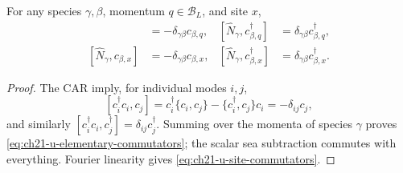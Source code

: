 \begin{lemma}
\label{lem:ch21-u-fundamental-commutators}
For any species \(\gamma,\beta\), momentum \(q\in\mathcal B_L\), and
site \(x\),
\begin{align}
 [\widehat N_\gamma,c_{\beta,q}]
   &=-\delta_{\gamma\beta}c_{\beta,q},&
 [\widehat N_\gamma,c_{\beta,q}^\dagger]
   &=\delta_{\gamma\beta}c_{\beta,q}^\dagger,
 \label{eq:ch21-u-elementary-commutators}\\
 [\widehat N_\gamma,c_{\beta,x}]
   &=-\delta_{\gamma\beta}c_{\beta,x},&
 [\widehat N_\gamma,c_{\beta,x}^\dagger]
   &=\delta_{\gamma\beta}c_{\beta,x}^\dagger.
 \label{eq:ch21-u-site-commutators}
\end{align}
\end{lemma}
\begin{proof}
The CAR imply, for individual modes \(i,j\),
\[
 [c_i^\dagger c_i,c_j]
   =c_i^\dagger\{c_i,c_j\}-\{c_i^\dagger,c_j\}c_i
   =-\delta_{ij}c_j,
\]
and similarly \([c_i^\dagger c_i,c_j^\dagger]=\delta_{ij}c_j^\dagger\).
Summing over the momenta of species \(\gamma\) proves
\eqref{eq:ch21-u-elementary-commutators}; the scalar sea subtraction
commutes with everything.  Fourier linearity gives
\eqref{eq:ch21-u-site-commutators}.
\end{proof}

